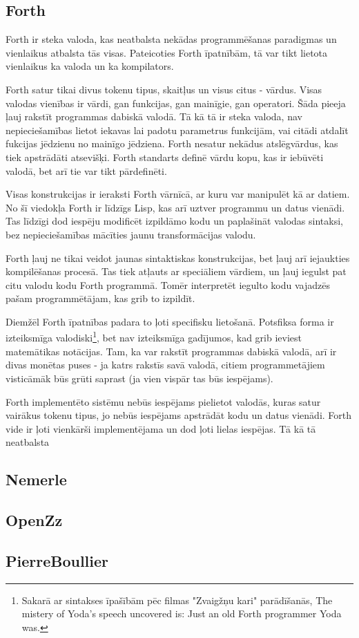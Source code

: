 \cite{Seibel:PracticalCommonLisp}

\subsection{Forth}

Forth ir steka valoda, kas neatbalsta nekādas programmēšanas paradigmas un vienlaikus atbalsta tās visas. Pateicoties Forth īpatnībām, tā var tikt lietota vienlaikus ka valoda un ka kompilators.

Forth satur tikai divus tokenu tipus, skaitļus un visus citus - vārdus. Visas valodas vienības ir vārdi, gan funkcijas, gan mainīgie, gan operatori. Šāda pieeja ļauj rakstīt programmas dabiskā valodā. Tā kā tā ir steka valoda, nav nepieciešamības lietot iekavas lai padotu parametrus funkcijām, vai citādi atdalīt fukcijas jēdzienu no mainīgo jēdziena. Forth nesatur nekādus atslēgvārdus, kas tiek apstrādāti atsevišķi. Forth standarts definē vārdu kopu, kas ir iebūvēti valodā, bet arī tie var tikt pārdefinēti.

Visas konstrukcijas ir ieraksti Forth vārnīcā, ar kuru var manipulēt kā ar datiem. No šī viedokļa Forth ir līdzīgs Lisp, kas arī uztver programmu un datus vienādi. Tas līdzīgi dod iespēju modificēt izpildāmo kodu un paplašināt valodas sintaksi, bez nepieciešamības mācīties jaunu transformācijas valodu.

Forth ļauj ne tikai veidot jaunas sintaktiskas konstrukcijas, bet ļauj arī iejaukties kompilēšanas procesā. Tas tiek atļauts ar speciāliem vārdiem, un ļauj iegulst pat citu valodu kodu Forth programmā. Tomēr interpretēt iegulto kodu vajadzēs pašam programmētājam, kas grib to izpildīt.

Diemžēl Forth īpatnības padara to ļoti specifisku lietošanā. Potsfiksa forma ir izteiksmīga valodiski\footnote{Sakarā ar sintakses īpašībām pēc filmas "Zvaigžņu kari" parādīšanās,  The mistery of Yoda’s speech uncovered is: Just an old Forth programmer Yoda was.}, bet nav izteiksmīga gadījumos, kad grib ieviest matemātikas notācijas. Tam, ka var rakstīt programmas dabiskā valodā, arī ir divas monētas puses - ja katrs rakstīs savā valodā, citiem programmetājiem visticāmāk būs grūti saprast (ja vien vispār tas būs iespējams).

Forth implementēto sistēmu nebūs iespējams pielietot valodās, kuras satur vairākus tokenu tipus, jo nebūs iespējams apstrādāt kodu un datus vienādi. Forth vide ir ļoti vienkārši implementējama un dod ļoti lielas iespējas. Tā kā tā neatbalsta 


\subsection{Nemerle}




\subsection{OpenZz}


\subsection{PierreBoullier}

